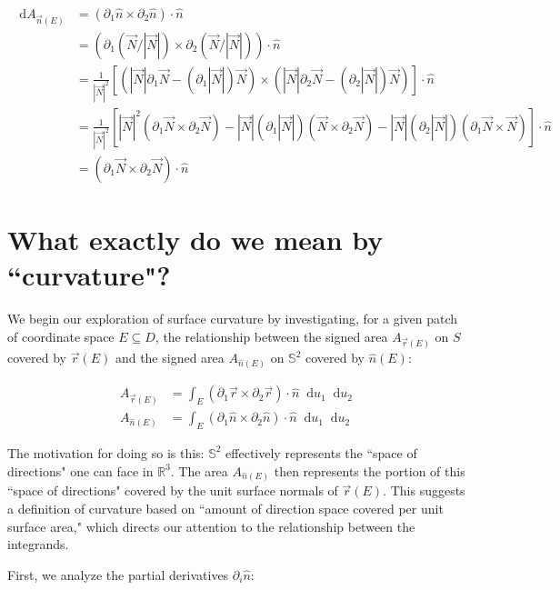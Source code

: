 \documentclass{article}
\newcommand*\diff{\mathop{}\!\mathrm{d}}
\begin{document}
\begin{align*}
  \diff A_{\vec{n}(E)} &= (\partial_1 \hat{n} \times \partial_2 \hat{n}) \cdot \hat{n} \\
  &=  (\partial_1 (\vec{N} / |\vec{N}|) \times \partial_2 (\vec{N} / |\vec{N}|)) \cdot \hat{n} \\
  &= \frac{1}{|\vec{N}|^2} [(|\vec{N}| \partial_1 \vec{N} - (\partial_1 |\vec{N}|)\vec{N}) \times (|\vec{N}| \partial_2 \vec{N} - (\partial_2|\vec{N}|)\vec{N})] \cdot \hat{n} \\
  &= \frac{1}{|\vec{N}|^2} [|\vec{N}|^2(\partial_1 \vec{N} \times \partial_2 \vec{N}) - |\vec{N}|(\partial_1 |\vec{N}|)(\vec{N} \times \partial_2 \vec{N}) - |\vec{N}| (\partial_2 |\vec{N}|)(\partial_1 \vec{N} \times \vec{N})] \cdot \hat{n} \\
  &= (\partial_1 \vec{N} \times \partial_2 \vec{N}) \cdot \hat{n}
\end{align*}

\section{What exactly do we mean by ``curvature"?}

We begin our exploration of surface curvature by investigating, for a given patch of coordinate space $E \subseteq D$, the relationship between the signed area $A_{\vec{r}(E)}$ on $S$ covered by $\vec{r}(E)$ and the signed area $A_{\hat{n}(E)}$ on $\mathbb{S}^2$ covered by $\hat{n}(E)$:

\begin{align*}
  A_{\vec{r}(E)} &= \int_E (\partial_1 \vec{r} \times \partial_2 \vec{r}) \cdot \hat{n} \diff{u_1} \diff{u_2} \\
  A_{\hat{n}(E)} &= \int_E (\partial_1 \hat{n} \times \partial_2 \hat{n}) \cdot \hat{n} \diff{u_1} \diff{u_2}
\end{align*}

The motivation for doing so is this: $\mathbb{S}^2$ effectively represents the ``space of directions" one can face in $\mathbb{R}^3$. The area $A_{\hat{n}(E)}$ then represents the portion of this ``space of directions" covered by the unit surface normals of $\vec{r}(E)$. This suggests a definition of curvature based on ``amount of direction space covered per unit surface area," which directs our attention to the relationship between the integrands.

First, we analyze the partial derivatives $\partial_i\hat{n}$:
\end{document}

